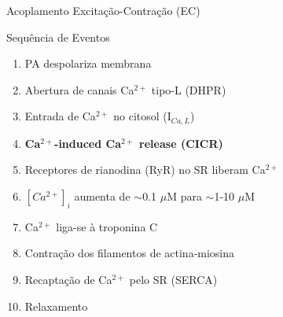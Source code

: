 \begin{frame}{Acoplamento Excitação-Contração (EC)}

\vspace{0.3cm}

\begin{block}{Sequência de Eventos}
\begin{enumerate}
    \item PA despolariza membrana
    \item Abertura de canais Ca$^{2+}$ tipo-L (DHPR)
    \item Entrada de Ca$^{2+}$ no citosol (I$_{Ca,L}$)
    \item \textbf{Ca$^{2+}$-induced Ca$^{2+}$ release (CICR)}
    \item Receptores de rianodina (RyR) no SR liberam Ca$^{2+}$
    \item $[Ca^{2+}]_i$ aumenta de $\sim$0.1 $\mu$M para $\sim$1-10 $\mu$M
    \item Ca$^{2+}$ liga-se à troponina C
    \item Contração dos filamentos de actina-miosina
    \item Recaptação de Ca$^{2+}$ pelo SR (SERCA)
    \item Relaxamento
\end{enumerate}
\end{block}
\end{frame}

